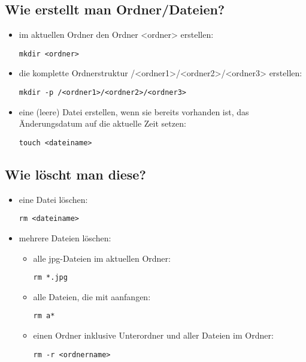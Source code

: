 \documentclass[a4paper,10pt]{article}
\begin{document}
\subsection{Wie erstellt man Ordner/Dateien?}
\begin{itemize}
\item im aktuellen Ordner den Ordner <ordner> erstellen: 
\begin{lstlisting}
mkdir <ordner>
\end{lstlisting} 
\item die komplette Ordnerstruktur /<ordner1>/<ordner2>/<ordner3> erstellen: 
\begin{lstlisting}
mkdir -p /<ordner1>/<ordner2>/<ordner3>
\end{lstlisting} 
\item eine (leere) Datei erstellen, wenn sie bereits vorhanden ist, 
das Änderungsdatum auf die aktuelle Zeit setzen: 
\begin{lstlisting}
touch <dateiname>
\end{lstlisting} 
\end{itemize}

\subsection{Wie löscht man diese?}
\begin{itemize}
\item eine Datei löschen: 
\begin{lstlisting}
rm <dateiname>
\end{lstlisting} 
\item mehrere Dateien löschen:
\begin{itemize}
\item alle jpg-Dateien im aktuellen Ordner: 
\begin{lstlisting}
rm *.jpg
\end{lstlisting} 
\item alle Dateien, die mit \glqq a\grqq anfangen: 
\begin{lstlisting}
rm a*
\end{lstlisting} 
\item einen Ordner inklusive Unterordner und aller Dateien im Ordner: 
\begin{lstlisting}
rm -r <ordnername>
\end{lstlisting} 
\end{itemize}
\end{itemize}
\end{document}
